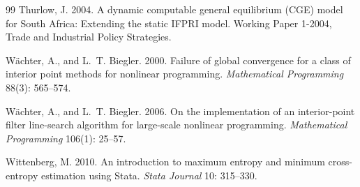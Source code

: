 \begin{thebibliography}{99}
Thurlow, J. 2004.
\newblock A dynamic computable general equilibrium (CGE) model for South
  Africa: Extending the static IFPRI model.
\newblock Working Paper 1-2004, Trade and Industrial Policy Strategies.

W\"achter, A., and L.~T. Biegler. 2000.
\newblock Failure of global convergence for a class of interior point
  methods for nonlinear programming.
\newblock \emph{Mathematical Programming} 88(3): 565--574.

W\"achter, A., and L.~T. Biegler. 2006.
\newblock On the implementation of an interior-point filter line-search
  algorithm for large-scale nonlinear programming.
\newblock \emph{Mathematical Programming} 106(1): 25--57.

Wittenberg, M. 2010.
\newblock An introduction to maximum entropy and minimum cross-entropy
  estimation using {Stata}.
\newblock \emph{Stata Journal} 10: 315--330.

\end{thebibliography}
